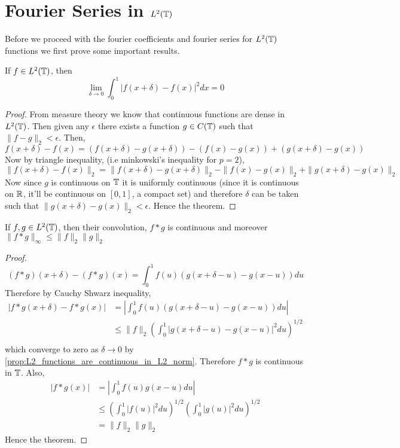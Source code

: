 \section{Fourier Series in $L^2(\mathbb T)$}
Before we proceed with the fourier coefficients and fourier series for $L^2(\mathbb T)$ functions we first prove some important results.
\begin{proposition}
  \label{prop:L2_functions_are_continuous_in_L2_norm}
  If $f \in L^2(\mathbb T)$, then
  \begin{displaymath}
   \lim_{\delta \to 0} \int_0^1 |f(x+\delta) - f(x)|^2 dx = 0
  \end{displaymath}
\end{proposition}
\begin{proof}
  From measure theory we know that continuous functions are dense in $L^2(\mathbb T)$. Then given any $\epsilon$ there exists a function $g\in C(\mathbb T)$ such that $\|f-g\|_2 < \epsilon$. Then,
  $$ f(x+\delta) - f(x) = (f(x+\delta) - g(x+\delta)) - (f(x) - g(x)) + ( g(x+\delta) - g(x))$$
  Now by triangle inequality, (i.e minkowski's inequality for $p = 2$), 
  $$ \|f(x+\delta) - f(x)\|_2 = \|f(x+\delta) - g(x+\delta)\|_2 - \|f(x) - g(x)\|_2 + \|g(x+\delta) - g(x)\|_2$$
  Now since $g$ is continuous on $\mathbb T$ it is uniformly continuous (since it is continuous on $\mathbb R$, it'll be continuous on $[0,1]$, a compact set) and therefore $\delta$ can be taken such that $\|g(x+\delta) - g(x) \|_2 < \epsilon$. Hence the theorem.
\end{proof}

\begin{proposition}
  \label{prop:convolution_of_L2_functions}
  If $f, g \in L^2(\mathbb T)$, then their convolution, $f*g$ is continuous and moreover $\|f*g\|_{\infty} \le \|f\|_2 \|g\|_2$
\end{proposition}
\begin{proof}
  $$(f*g)(x+\delta) - (f*g)(x) = \int_0^1 f(u)(g(x+\delta - u) - g(x-u)) du $$
  Therefore by Cauchy Shwarz inequality, 
  \begin{align*}
    |f*g(x+\delta) - f*g(x)| &= \left| \int_0^1 f(u) (g(x + \delta -u)- g(x-u)) du \right| \\
          &\le \|f\|_2 \left( \int_0^1|g(x+\delta - u) - g(x-u)|^2 du \right)^{1/2} \\
  \end{align*}
  which converge to zero as $\delta \to 0$ by \autoref{prop:L2_functions_are_continuous_in_L2_norm}. Therefore $f*g$ is continuous in $\mathbb T$.
  Also, 
  \begin{align*}
    |f*g(x)| &= \left| \int_0^1 f(u)g(x-u) du \right| \\
            &\le \left(\int_0^1 |f(u)|^2 du \right)^{1/2} \left(\int_0^1 |g(u)|^2 du \right)^{1/2} \\
            &= \|f\|_2 \|g\|_2
  \end{align*}
  Hence the theorem.
\end{proof}

